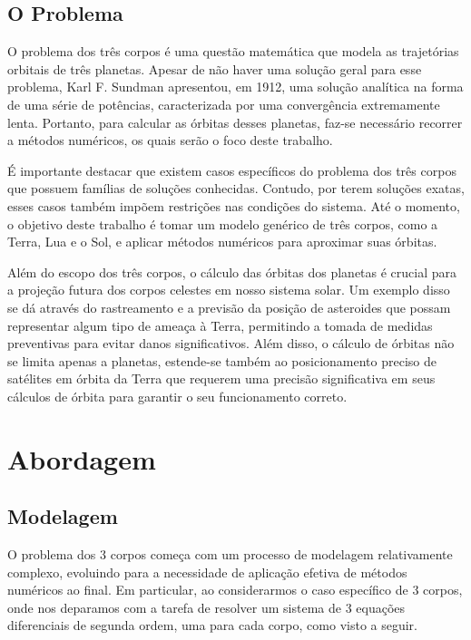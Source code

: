 \documentclass[a4paper, 12pt]{article} %
\begin{document}
\subsection{O Problema}
O problema dos três corpos é uma questão matemática que modela as trajetórias orbitais de três planetas. Apesar de não haver uma solução geral para esse problema, Karl F. Sundman \cite{sundman} apresentou, em 1912, uma solução analítica na forma de uma série de potências, caracterizada por uma convergência extremamente lenta. Portanto, para calcular as órbitas desses planetas, faz-se necessário recorrer a métodos numéricos, os quais serão o foco deste trabalho.

É importante destacar que existem casos específicos do problema dos três corpos que possuem famílias de soluções conhecidas. Contudo, por terem soluções exatas, esses casos também impõem restrições nas condições do sistema. Até o momento, o objetivo deste trabalho é tomar um modelo genérico de três corpos, como a Terra, Lua e o Sol, e aplicar métodos numéricos para aproximar suas órbitas.

Além do escopo dos três corpos, o cálculo das órbitas dos planetas é crucial para a projeção futura dos corpos celestes em nosso sistema solar. Um exemplo disso se dá através do rastreamento e a previsão da posição de asteroides que possam representar algum tipo de ameaça à Terra, permitindo a tomada de medidas preventivas para evitar danos significativos. Além disso, o cálculo de órbitas não se limita apenas a planetas, estende-se também ao posicionamento preciso de satélites em órbita da Terra que requerem uma precisão significativa em seus cálculos de órbita para garantir o seu funcionamento correto.

\section{Abordagem}
\subsection{Modelagem}
O problema dos 3 corpos começa com um processo de modelagem relativamente complexo, evoluindo para a necessidade de aplicação efetiva de métodos numéricos ao final. Em particular, ao considerarmos o caso específico de 3 corpos, onde nos deparamos com a tarefa de resolver um sistema de 3 equações diferenciais de segunda ordem, uma para cada corpo, como visto a seguir.
\end{document}
